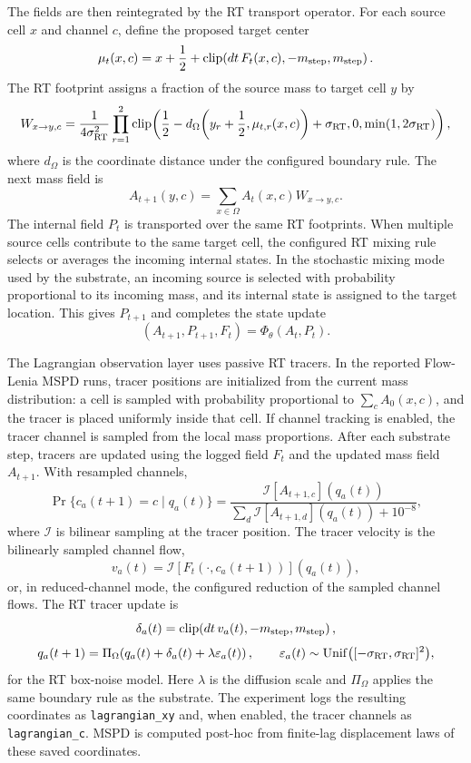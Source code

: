 The fields are then reintegrated by the RT transport operator.  For each source cell $x$ and channel $c$, define the proposed target center
\[
  \mu_t(x,c)=x+\frac12+\mathrm{clip}\!\left(dt\,F_t(x,c),-m_{\rm step},m_{\rm step}\right).
\]
The RT footprint assigns a fraction of the source mass to target cell $y$ by
\[
  W_{x\to y,c}
  =
  \frac{1}{4\sigma_{\rm RT}^2}
  \prod_{r=1}^2
  \mathrm{clip}\!\left(
    \frac12 - d_\Omega\!\left(y_r+\frac12,\mu_{t,r}(x,c)\right)+\sigma_{\rm RT},
    0,
    \min(1,2\sigma_{\rm RT})
  \right),
\]
where $d_\Omega$ is the coordinate distance under the configured boundary rule.  The next mass field is
\[
  A_{t+1}(y,c)=\sum_{x\in\Omega} A_t(x,c)W_{x\to y,c}.
\]
The internal field $P_t$ is transported over the same RT footprints.  When multiple source cells contribute to the same target cell, the configured RT mixing rule selects or averages the incoming internal states.  In the stochastic mixing mode used by the substrate, an incoming source is selected with probability proportional to its incoming mass, and its internal state is assigned to the target location.  This gives $P_{t+1}$ and completes the state update
\[
  (A_{t+1},P_{t+1},F_t)=\Phi_\theta(A_t,P_t).
\]

The Lagrangian observation layer uses passive RT tracers.  In the reported Flow-Lenia MSPD runs, tracer positions are initialized from the current mass distribution: a cell is sampled with probability proportional to $\sum_c A_0(x,c)$, and the tracer is placed uniformly inside that cell.  If channel tracking is enabled, the tracer channel is sampled from the local mass proportions.  After each substrate step, tracers are updated using the logged field $F_t$ and the updated mass field $A_{t+1}$.  With resampled channels,
\[
  \Pr\{c_a(t+1)=c\mid q_a(t)\}
  =
  \frac{\mathcal I[A_{t+1,c}](q_a(t))}{\sum_d \mathcal I[A_{t+1,d}](q_a(t))+10^{-8}},
\]
where $\mathcal I$ is bilinear sampling at the tracer position.  The tracer velocity is the bilinearly sampled channel flow,
\[
  v_a(t)=\mathcal I[F_t(\cdot,c_a(t+1))](q_a(t)),
\]
or, in reduced-channel mode, the configured reduction of the sampled channel flows.  The RT tracer update is
\[
  \delta_a(t)=\mathrm{clip}\!\left(dt\,v_a(t),-m_{\rm step},m_{\rm step}\right),
\]
\[
  q_a(t+1)=\Pi_\Omega\!\left(q_a(t)+\delta_a(t)+\lambda\varepsilon_a(t)\right),
  \qquad
  \varepsilon_a(t)\sim\mathrm{Unif}\bigl([-\sigma_{\rm RT},\sigma_{\rm RT}]^2\bigr),
\]
for the RT box-noise model.  Here $\lambda$ is the diffusion scale and $\Pi_\Omega$ applies the same boundary rule as the substrate.  The experiment logs the resulting coordinates as \texttt{lagrangian\_xy} and, when enabled, the tracer channels as \texttt{lagrangian\_c}.  MSPD is computed post-hoc from finite-lag displacement laws of these saved coordinates.


